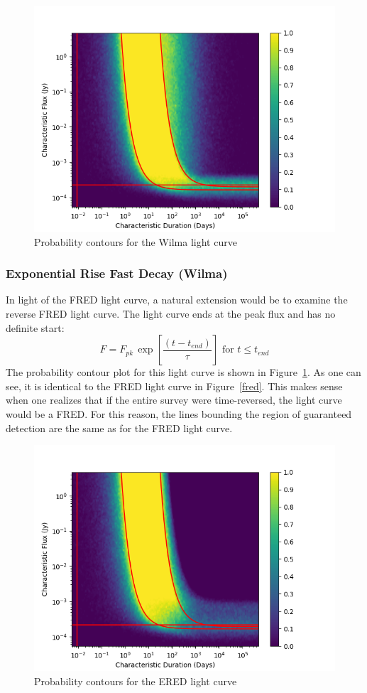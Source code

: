 \documentclass[12pt]{article}
\begin{document}
\begin{figure}
\includegraphics[width=\columnwidth]{wilma.png}
\caption{Probability contours for the Wilma light curve}
\label{wilma}
 \end{figure}
 
\subsubsection{Exponential Rise Fast Decay (Wilma)}
In light of the FRED light curve, a natural extension would be to examine the reverse FRED light curve. The light curve ends at the peak flux and has no definite start:
\begin{equation}F=F_{pk}\,\exp\left[{\frac{(t-t_{end})}{\tau}}\right]\text{ for }t\le t_{end}\end{equation}
The probability contour plot for this light curve is shown in Figure~\ref{wilma}. As one can see, it is identical to the FRED light curve in Figure~\ref{fred}. This makes sense when one realizes that if the entire survey were time-reversed, the light curve would be a FRED. For this reason, the lines bounding the region of guaranteed detection are the same as for the FRED light curve. 

\begin{figure}
\includegraphics[width=\columnwidth]{ered.png}
\caption{Probability contours for the ERED light curve}
\label{ered}
 \end{figure}
 
\end{document}
